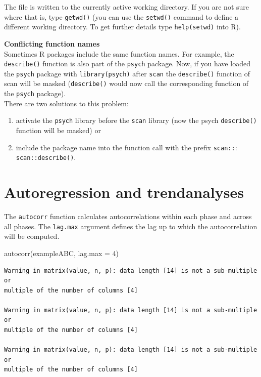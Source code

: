 \documentclass[
]{book}
\makeatletter
\newenvironment{Shaded}{\begin{snugshade}}{\end{snugshade}}
\newcommand{\AttributeTok}[1]{\textcolor[rgb]{0.77,0.63,0.00}{#1}}
\newcommand{\DecValTok}[1]{\textcolor[rgb]{0.00,0.00,0.81}{#1}}
\newcommand{\FunctionTok}[1]{\textcolor[rgb]{0.00,0.00,0.00}{#1}}
\newcommand{\NormalTok}[1]{#1}
\providecommand{\tightlist}{%
  \setlength{\itemsep}{0pt}\setlength{\parskip}{0pt}}
\newenvironment{kframe}{%
\medskip{}
\setlength{\fboxsep}{.8em}
 \def\at@end@of@kframe{}%
 \ifinner\ifhmode%
  \def\at@end@of@kframe{\end{minipage}}%
  \begin{minipage}{\columnwidth}%
 \fi\fi%
 \def\FrameCommand##1{\hskip\@totalleftmargin \hskip-\fboxsep
 \colorbox{shadecolor}{##1}\hskip-\fboxsep
     \hskip-\linewidth \hskip-\@totalleftmargin \hskip\columnwidth}%
 \MakeFramed {\advance\hsize-\width
   \@totalleftmargin\z@ \linewidth\hsize
   \@setminipage}}%
 {\par\unskip\endMakeFramed%
 \at@end@of@kframe}
\newenvironment{rmdblock}[1]
  {
  \begin{itemize}
  \renewcommand{\labelitemi}{
    \raisebox{-.7\height}[0pt][0pt]{
      {\setkeys{Gin}{width=3em,keepaspectratio}\texttt{[image: images/\#1]}}
    }
  }
  \setlength{\fboxsep}{1em}
  \begin{kframe}
  \item
  }
  {
  \end{kframe}
  \end{itemize}
  }
\newenvironment{rmdnote}
  {\begin{rmdblock}{bulp}}
{\end{rmdblock}}
\makeatother
\begin{document}
The file is written to the currently active working directory. If you are not sure where that is, type \texttt{getwd()} (you can use the \texttt{setwd()} command to define a different working directory. To get further details type \texttt{help(setwd)} into R).

\begin{rmdnote}
\textbf{Conflicting function names}\\
Sometimes R packages include the same function names. For example, the
\texttt{describe()} function is also part of the \texttt{psych} package.
Now, if you have loaded the \texttt{psych} package with
\texttt{library(psych)} after \texttt{scan} the \texttt{describe()}
function of scan will be masked (\texttt{describe()} would now call the
corresponding function of the \texttt{psych} package).\\
There are two solutions to this problem:

\begin{enumerate}
\def\labelenumi{\arabic{enumi}.}
\tightlist
\item
  activate the \texttt{psych} library before the \texttt{scan} library
  (now the psych \texttt{describe()} function will be masked) or
\item
  include the package name into the function call with the prefix
  \texttt{scan::}: \texttt{scan::describe()}.
\end{enumerate}
\end{rmdnote}

\hypertarget{autoregression-and-trendanalyses}{%
\section{Autoregression and trendanalyses}\label{autoregression-and-trendanalyses}}

The \texttt{autocorr} function calculates autocorrelations within each phase and across all phases. The \texttt{lag.max} argument defines the lag up to which the autocorrelation will be computed.

\begin{Shaded}
\begin{Highlighting}[]
\FunctionTok{autocorr}\NormalTok{(exampleABC, }\AttributeTok{lag.max =} \DecValTok{4}\NormalTok{)}
\end{Highlighting}
\end{Shaded}

\begin{verbatim}
Warning in matrix(value, n, p): data length [14] is not a sub-multiple or
multiple of the number of columns [4]

Warning in matrix(value, n, p): data length [14] is not a sub-multiple or
multiple of the number of columns [4]

Warning in matrix(value, n, p): data length [14] is not a sub-multiple or
multiple of the number of columns [4]
\end{verbatim}
\end{document}
